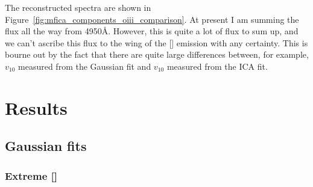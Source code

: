 The reconstructed spectra are shown in Figure~\ref{fig:mfica_components_oiii_comparison}. 
At present I am summing the flux all the way from 4950\AA. 
However, this is quite a lot of flux to sum up, and we can't ascribe this flux to the wing of the [] emission with any certainty. 
This is bourne out by the fact that there are quite large differences between, for example, $v_{10}$ measured from the Gaussian fit and $v_{10}$ measured from the ICA fit. 

\section{Results}

\subsection{Gaussian fits}

\subsubsection{Extreme []}

